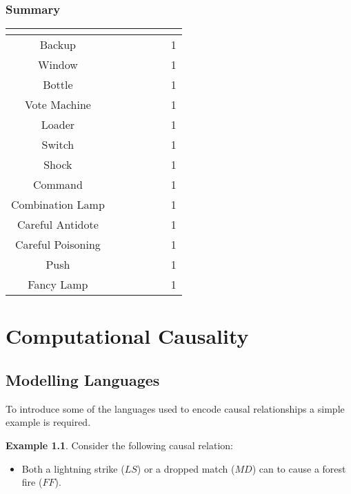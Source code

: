 \documentclass[11pt,a4paper]{book}
\theoremstyle{definition}
\theoremstyle{definition}
\newtheorem{example}{Example}[section]
\theoremstyle{definition}
\theoremstyle{remark}
\begin{document}
\subsection{Summary}
\begin{table}[]
\begin{tabular}{ | c | c | c | c | c | c | c |}
\hline 
& \cite{batusov2018situation} & \cite{beckers2018principled} & \cite{bochman2018actual}  & \cite{hiddleston2005causal} & \cite{hitchcock2007three}  & \cite{Weslake2015partialtheory}  \\
\hline 
Backup & &  &  &  &  &  1 \\
Window  & &  &  &  &  &  1 \\
Bottle  & &  &  &  &  &  1 \\
Vote Machine  & &  &  &  &  &  1 \\
Loader  & &  &  &  &  &  1 \\
Switch  & &  &  &  &  &  1 \\
Shock  & &  &  &  &  &  1 \\
Command  & &  &  &  &  &  1 \\
Combination Lamp  & &  &  &  &  &  1 \\
Careful Antidote  & &  &  &  &  &  1 \\
Careful Poisoning & & &  &  &  &   1 \\
Push  & &  &  &  &  &  1 \\
Fancy Lamp  & &  &  &  &  &  1 \\
\hline 
\end{tabular}
\end{table}

\chapter{Computational Causality}

\section{Modelling Languages}

To introduce some of the languages used to encode causal relationships a simple example is required. 
\begin{example}
\label{ex:causal_model_forrest_fire_1}
Consider the following causal relation:
\begin{itemize}
\item Both a lightning strike ($\mathit{LS}$) or a dropped match ($\mathit{MD}$) can to cause a forest fire ($\mathit{FF}$).
\end{itemize}
\end{example}
\end{document}
